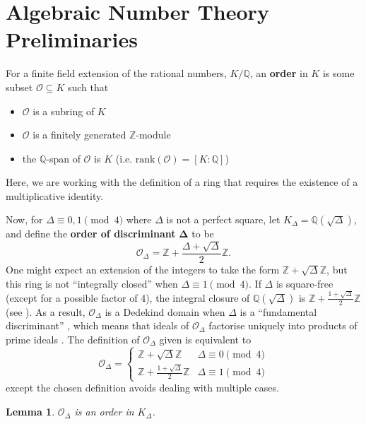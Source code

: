\documentclass[honours,12pt]{unswthesis}
\newcommand{\Z}{\mathbb{Z}} %
\newcommand{\Q}{\mathbb{Q}} %
\newcommand{\order}{\mathcal{O}} %
\newtheorem{lemma}[theorem]{Lemma}
\numberwithin{equation}{section}
\begin{document}
\section{Algebraic Number Theory Preliminaries}\label{s-comp-algebraic}
For a finite field extension of the rational numbers, $K/\Q$, an \textbf{order} in $K$ is some subset $\order \subseteq K$ such that \cite[Def.\,4.6.1]{cohen}
\begin{itemize}
    \item $\order$ is a subring of $K$
    \item $\order$ is a finitely generated $\Z$-module
    \item the $\Q$-span of $\order$ is $K$ (i.e. $\text{rank}(\order) = [K:\Q]$)
\end{itemize}
Here, we are working with the definition of a ring that requires the existence of a multiplicative identity.

Now, for $\Delta \equiv 0, 1 \pmod{4}$ where $\Delta$ is not a perfect square, let $K_\Delta = \Q(\sqrt\Delta)$, and define the \textbf{order of discriminant} $\mathbf{\Delta}$ to be 
$$\order_\Delta = \Z + \frac{\Delta + \sqrt\Delta}{2}\Z.$$
One might expect an extension of the integers to take the form $\Z + \sqrt\Delta \Z$, but this ring is not ``integrally closed'' when $\Delta \equiv 1 \pmod{4}$.
If $\Delta$ is square-free (except for a possible factor of 4), the integral closure of $\Q(\sqrt\Delta)$ is $\Z + \frac{1 + \sqrt\Delta}{2}\Z$ (see \cite[Ch.\,1\,\S\,2,\,Exercise\,4]{neukirch}).
As a result, $\order_\Delta$ is a Dedekind domain when $\Delta$ is a ``fundamental discriminant'' \cite[Thm.\,14]{marcus}, which means that ideals of $\order_\Delta$ factorise uniquely into products of prime ideals \cite[Thm.\,16]{marcus}.
The definition of $\order_\Delta$ given is equivalent to
$$\order_\Delta = \begin{cases}
    \Z + \sqrt\Delta \Z & \Delta \equiv 0 \pmod{4} \\
    \Z + \frac{1 + \sqrt\Delta}{2} \Z & \Delta \equiv 1 \pmod{4}
\end{cases}$$
except the chosen definition avoids dealing with multiple cases.

\vspace{2mm}
\begin{lemma}
    $\order_\Delta$ is an order in $K_\Delta$.
\end{lemma}
\end{document}
